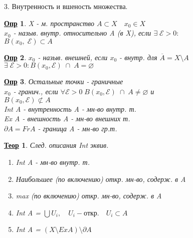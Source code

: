 \documentclass[12pt, fleqn]{article}
\newenvironment{question}[1]{\hspace*{-4em} #1}{\newpage}
\theoremstyle{nonumbermarginbreak}
\newtheorem{theorem}{\hspace*{-2em}\underline{\bfseries Теор}}[section]
\newtheorem{definition}{\hspace*{-2em}\underline{\bfseries Опр}}[section]
\begin{document}
    \begin{question}{3. Внутренность и вшеность множества.}
        \begin{definition} 
            X - м. пространство $A \subset X \quad x_0 \in X$\\
            $x_0$ - назыв. внутр. относительно A (в X), если $\exists \; \mathcal{E} > 0:$\\
            $B(x_0, \; \mathcal{E}) \subset A$
        \end{definition}

        \begin{definition} 
            $x_0$ - назыв. внешней, если $x_0$ - внутр. для $\overline{A} = X \setminus A$\\
            $\exists \; \mathcal{E} > 0 : B(x_0, \mathcal{E}) \; \cap \; A = \varnothing$
        \end{definition}

        \begin{definition} 
            Остальные точки - граничные\\
            $x_0$ - гранич., если $\forall \mathcal{E} > 0 \; B(x_0, \mathcal{E}) \; \cap \; A \neq \varnothing$ и\\
            $B(x_0, \mathcal{E}) \not\subset A$\\
            Int A - внутренность A - мн-во внутр. т.\\
            Ex A - внешность A - мн-во внешних т.\\
            $\partial A = Fr A$ - граница A - мн-во гр.т.
        \end{definition}

        \begin{theorem} 
            След. описания Int эквив.\\
            \begin{enumerate}
                \item Int A - мн-во внутр. т.
                \item Наибольшее (по включению) откр. мн-во, содерж. в A
                \item max (по включению) откр. мн-во, содерж. в A
                \item Int A = $\bigcup U_i, \quad U_i - \text{откр.} \quad U_i \subset A$
                \item Int A = $(X \setminus Ex A) \setminus \partial A$ 
            \end{enumerate}
        \end{theorem}


\end{question}
\end{document}
